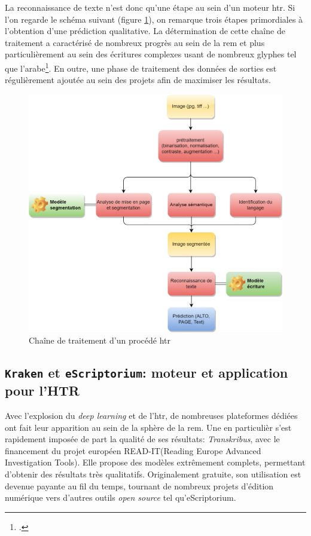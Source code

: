 	La reconnaissance de texte n'est donc qu'une étape au sein d'un moteur \gls{htr}. Si l'on regarde le schéma suivant (figure \ref{fig:htr_schema}), on remarque trois étapes primordiales à l'obtention d'une prédiction qualitative. La détermination de cette chaîne de traitement a caractérisé de nombreux progrès au sein de la \gls{rem} et plus particulièrement au sein des écritures complexes usant de nombreux glyphes tel que l'arabe\footcite{kiesslingBADAMPublicDataset2019}. En outre, une phase de traitement des données de sorties est régulièrement ajoutée au sein des projets afin de maximiser les résultats.
	
	\begin{figure}[h!]
	    \centering
	    \includegraphics[width=1\textwidth]{annexes/schema/HTR_processus.png}
	    \caption{Chaîne de traitement d'un procédé \gls{htr}}
	    \label{fig:htr_schema}
	\end{figure}
	
	\subsection{\texttt{Kraken} et \texttt{eScriptorium}: moteur et application pour l'HTR}
	
	Avec l'explosion du \textit{deep learning} et de l'\gls{htr}, de nombreuses plateformes dédiées ont fait leur apparition au sein de la sphère de la \gls{rem}. Une en particulièr s'est rapidement imposée de part la qualité de ses résultats: \textit{Transkribus}, avec le financement du projet européen READ-IT(Reading Europe Advanced Investigation Tools). Elle propose des modèles extrêmement complets, permettant d'obtenir des résultats très qualitatifs. Originalement gratuite, son utilisation est devenue payante au fil du temps, tournant de nombreux projets d'édition numérique vers d'autres outils \textit{open source} tel qu'\gls{eScriptorium}.
	
